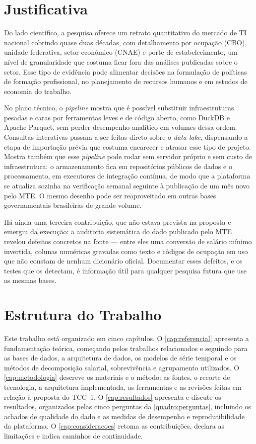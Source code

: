 \section{Justificativa}

Do lado científico, a pesquisa oferece um retrato quantitativo do mercado de TI nacional cobrindo quase duas décadas, com detalhamento por ocupação (CBO), unidade federativa, setor econômico (CNAE) e porte de estabelecimento, um nível de granularidade que costuma ficar fora das análises publicadas sobre o setor. Esse tipo de evidência pode alimentar decisões na formulação de políticas de formação profissional, no planejamento de recursos humanos e em estudos de economia do trabalho.

No plano técnico, o \textit{pipeline} mostra que é possível substituir infraestruturas pesadas e caras por ferramentas leves e de código aberto, como DuckDB e Apache Parquet, sem perder desempenho analítico em volumes dessa ordem. Consultas interativas passam a ser feitas direto sobre o \textit{data lake}, dispensando a etapa de importação prévia que costuma encarecer e atrasar esse tipo de projeto. Mostra também que esse \textit{pipeline} pode rodar sem servidor próprio e sem custo de infraestrutura: o armazenamento fica em repositórios públicos de dados e o processamento, em executores de integração contínua, de modo que a plataforma se atualiza sozinha na verificação semanal seguinte à publicação de um mês novo pelo MTE. O mesmo desenho pode ser reaproveitado em outras bases governamentais brasileiras de grande volume.

Há ainda uma terceira contribuição, que não estava prevista na proposta e emergiu da execução: a auditoria sistemática do dado publicado pelo MTE revelou defeitos concretos na fonte --- entre eles uma conversão de salário mínimo invertida, colunas numéricas gravadas como texto e códigos de ocupação em uso que não constam de nenhum dicionário oficial. Documentar esses defeitos, e os testes que os detectam, é informação útil para qualquer pesquisa futura que use as mesmas bases.

\section{Estrutura do Trabalho}

Este trabalho está organizado em cinco capítulos. O \autoref{cap:referencial} apresenta a fundamentação teórica, começando pelos trabalhos relacionados e seguindo para as bases de dados, a arquitetura de dados, os modelos de série temporal e os métodos de decomposição salarial, sobrevivência e agrupamento utilizados. O \autoref{cap:metodologia} descreve os materiais e o método: as fontes, o recorte de tecnologia, a arquitetura implementada, as ferramentas e as revisões feitas em relação à proposta do TCC~1. O \autoref{cap:resultados} apresenta e discute os resultados, organizados pelas cinco perguntas da \autoref{quadro:perguntas}, incluindo os achados de qualidade do dado e as medidas de desempenho e reprodutibilidade da plataforma. O \autoref{cap:consideracoes} retoma as contribuições, declara as limitações e indica caminhos de continuidade.
